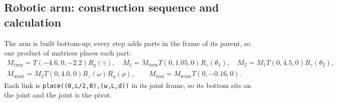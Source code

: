 \documentclass[10pt,a4paper]{article}
\newcommand{\fn}[1]{\texttt{#1}}
\begin{document}
\subsection{Robotic arm: construction sequence and calculation}
The arm is built bottom-up; every step adds parts in the frame of its parent, so one product of matrices places each part:
\begin{equation}\begin{gathered}
M_{\text{turn}}=T(-4.6,0,-2.2)R_y(\gamma),\quad M_1=M_{\text{turn}}T(0,1.05,0)R_z(\theta_1),\quad M_2=M_1T(0,4.5,0)R_z(\theta_2),\\
M_{\text{wrist}}=M_2T(0,4.0,0)R_z(\omega)R_y(\rho),\qquad M_{\text{tool}}=M_{\text{wrist}}T(0,-0.16,0).
\end{gathered}\label{eq:robotchain}\end{equation}
Each link is \fn{place((0,L/2,0),(w,L,d))} in its joint frame, so its bottom sits on the joint and the joint is the pivot.
\end{document}
